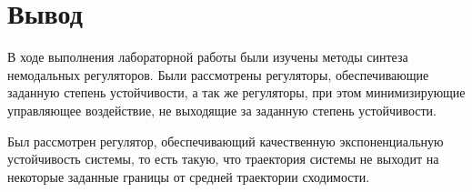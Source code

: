 
\FloatBarrier

\FloatBarrier   

\FloatBarrier
\section{Вывод}
В ходе выполнения лабораторной работы были изучены методы синтеза немодальных 
регуляторов. Были рассмотрены регуляторы, обеспечивающие заданную степень
устойчивости, а так же регуляторы, при этом минимизирующие управляющее воздействие, 
не выходящие за заданную степень устойчивости. 

Был рассмотрен регулятор, обеспечивающий качественную экспоненциальную 
устойчивость системы, то есть такую, что траектория системы не выходит 
на некоторые заданные границы от средней траектории сходимости.